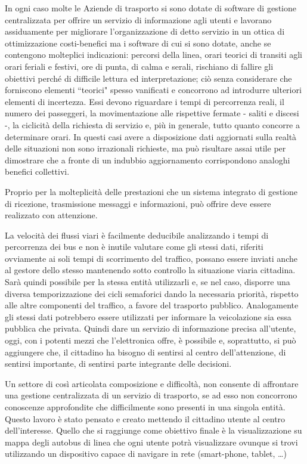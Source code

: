 In ogni caso molte le Aziende di trasporto si sono dotate di software di gestione centralizzata per offrire un servizio  di informazione agli utenti e lavorano assiduamente per migliorare l’organizzazione di detto servizio in un ottica di ottimizzazione costi-benefici ma i software di cui si sono dotate, anche se contengono molteplici indicazioni: percorsi della linea, orari teorici di transiti agli orari feriali e festivi, ore di punta, di calma e serali, rischiano di fallire gli obiettivi perché di difficile lettura ed interpretazione; ciò senza considerare che forniscono elementi ``teorici" spesso vanificati e concorrono ad introdurre ulteriori elementi di incertezza. Essi devono riguardare i tempi di percorrenza reali, il numero dei passeggeri, la movimentazione alle rispettive fermate - saliti e discesi -, la ciclicità della richiesta di servizio e, più in generale, tutto quanto concorre a determinare orari. In questi casi avere a disposizione dati aggiornati sulla realtà delle situazioni non sono irrazionali richieste, ma può risultare assai utile per dimostrare che a fronte di un indubbio aggiornamento corrispondono analoghi benefici collettivi.

Proprio per la molteplicità delle prestazioni che un sistema integrato di gestione di ricezione, trasmissione messaggi e  informazioni, può offrire deve essere realizzato con attenzione.

La velocità dei flussi viari è facilmente deducibile analizzando i tempi di percorrenza dei bus e non è inutile valutare come gli stessi dati, riferiti ovviamente ai soli tempi di scorrimento del traffico, possano essere inviati anche al gestore dello stesso mantenendo sotto controllo la situazione viaria cittadina. Sarà quindi possibile per la stessa entità utilizzarli e, se nel caso, disporre una diversa temporizzazione dei cicli semaforici dando la necessaria priorità, rispetto alle altre componenti del traffico, a favore del trasporto pubblico.
Analogamente gli stessi dati potrebbero essere utilizzati per informare la veicolazione sia essa pubblica che privata.
Quindi dare un servizio di informazione precisa all’utente, oggi, con i potenti mezzi che l’elettronica offre,  è possibile e, soprattutto, si può aggiungere che, il cittadino ha bisogno di sentirsi al centro dell’attenzione, di sentirsi importante, di sentirsi parte integrante delle decisioni.

Un settore di così articolata composizione e difficoltà, non consente di affrontare una gestione centralizzata di un servizio di trasporto, se ad esso non concorrono conoscenze approfondite che difficilmente sono presenti in una singola entità.
Questo lavoro è stato pensato e creato mettendo il cittadino utente al centro dell’interesse. Quello che si raggiunge come obiettivo finale è la visualizzazione su mappa degli autobus di linea  che ogni utente potrà visualizzare ovunque si trovi utilizzando un dispositivo capace di navigare in rete (smart-phone, tablet, …)

